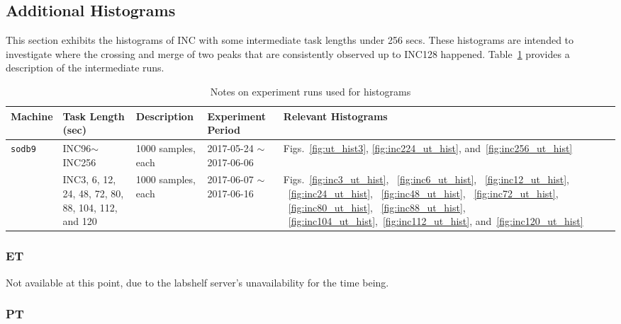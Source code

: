 \clearpage

\pagebreak
\newpage

\subsection{Additional Histograms}
This section exhibits the histograms of INC with some intermediate task lengths under 256 secs. 
These histograms are intended to investigate where the crossing and merge of two peaks that are consistently observed up to INC128 
happened. Table~\ref{tab:exp_notes4} provides a description of the intermediate runs. 
\begin{table}[h]
\begin{center}
\begin{tabular}{|p{2cm}|p{3cm}|p{3cm}|p{4cm}|p{3.5cm}|} \hline
Machine & Task Length (sec) & Description & Experiment Period & Relevant \linebreak Histograms\\ \hline
{\tt sodb9} &  INC96$\sim$INC256 & 1000 samples, each & 2017-05-24 $\sim$ 2017-06-06 & 
Figs.~\ref{fig:ut_hist3}, \ref{fig:inc224_ut_hist}, and~\ref{fig:inc256_ut_hist}\\ \hline
					&  INC3, 6, 12, 24, 48, 72, 80, 88, 104, 112, and 120 & 1000 samples, each & 2017-06-07 $\sim$ 2017-06-16 & Figs.~\ref{fig:inc3_ut_hist}, ~\ref{fig:inc6_ut_hist}, ~\ref{fig:inc12_ut_hist}, ~\ref{fig:inc24_ut_hist},
~\ref{fig:inc48_ut_hist}, ~\ref{fig:inc72_ut_hist}, ~\ref{fig:inc80_ut_hist}, ~\ref{fig:inc88_ut_hist}, ~\ref{fig:inc104_ut_hist},~\ref{fig:inc112_ut_hist}, and~\ref{fig:inc120_ut_hist}\\ \hline
\end{tabular}
\end{center}
\vspace{-.2in}
\caption{Notes on experiment runs used for histograms\label{tab:exp_notes4}}
\end{table}

\subsubsection{ET}
Not available at this point, due to the labshelf server's unavailability for the time being.

\subsubsection{PT}

